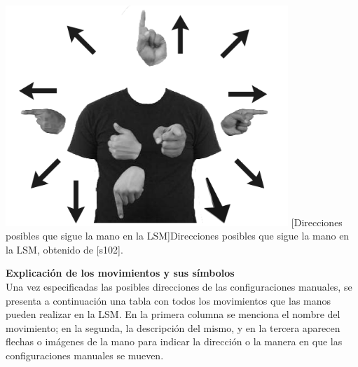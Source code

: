\begin{center}
    \includegraphics[width=0.8\textwidth]{Images/Cap 2/Direccion_Manos_LSM.png}
    [Direcciones posibles que sigue la mano en la LSM]{Direcciones posibles que sigue la mano en la LSM, obtenido de [s102].}  %
\end{center}

\textbf{Explicación de los movimientos y sus símbolos}\\
Una vez especificadas las posibles direcciones de las configuraciones manuales, se presenta a continuación una tabla con todos los movimientos que las manos pueden realizar en la LSM. En la primera columna se menciona el nombre del movimiento; en la segunda, la descripción del mismo, y en la tercera aparecen flechas o imágenes de la mano para indicar la dirección o la manera en que las configuraciones manuales se mueven.\\

\renewcommand\arraystretch{1.3}
\setlength{\fboxsep}{4pt}

